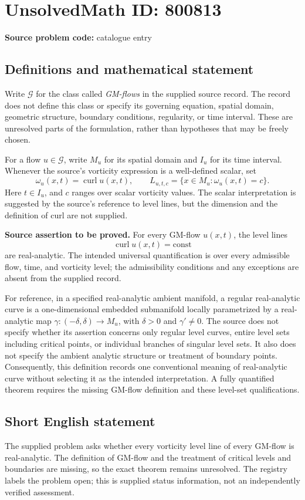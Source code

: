 \documentclass[11pt]{article}
\begin{document}
\section*{UnsolvedMath ID: 800813}
\textbf{Source problem code:} catalogue entry
\subsection{Definitions and mathematical statement}
Write \(\mathcal G\) for the class called \emph{GM-flows} in the supplied source record. The record does not define this class or specify its governing equation, spatial domain, geometric structure, boundary conditions, regularity, or time interval. These are unresolved parts of the formulation, rather than hypotheses that may be freely chosen.

For a flow \(u\in\mathcal G\), write \(M_u\) for its spatial domain and \(I_u\) for its time interval. Whenever the source's vorticity expression is a well-defined scalar, set
\[
\omega_u(x,t)=\operatorname{curl}u(x,t),\qquad
L_{u,t,c}=\{x\in M_u:\omega_u(x,t)=c\}.
\]
Here \(t\in I_u\), and \(c\) ranges over scalar vorticity values. The scalar interpretation is suggested by the source's reference to level lines, but the dimension and the definition of curl are not supplied.

\textbf{Source assertion to be proved.} For every GM-flow \(u(x,t)\), the level lines
\[
\operatorname{curl}u(x,t)=\mathrm{const}
\]
are real-analytic. The intended universal quantification is over every admissible flow, time, and vorticity level; the admissibility conditions and any exceptions are absent from the supplied record.

For reference, in a specified real-analytic ambient manifold, a regular real-analytic curve is a one-dimensional embedded submanifold locally parametrized by a real-analytic map \(\gamma:(-\delta,\delta)\to M_u\), with \(\delta>0\) and \(\gamma'\ne0\). The source does not specify whether its assertion concerns only regular level curves, entire level sets including critical points, or individual branches of singular level sets. It also does not specify the ambient analytic structure or treatment of boundary points. Consequently, this definition records one conventional meaning of real-analytic curve without selecting it as the intended interpretation. A fully quantified theorem requires the missing GM-flow definition and these level-set qualifications.
\subsection{Short English statement}
The supplied problem asks whether every vorticity level line of every GM-flow is real-analytic. The definition of GM-flow and the treatment of critical levels and boundaries are missing, so the exact theorem remains unresolved. The registry labels the problem open; this is supplied status information, not an independently verified assessment.
\end{document}
